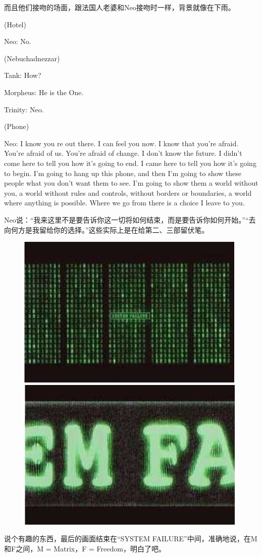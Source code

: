 \documentclass[UTF8]{ctexart}
\newenvironment{myquote}{\color{green} \setlength{\leftskip}{6em} \setlength{\rightskip}{4em} \setlength{\parindent}{-2em}}{\par}
\begin{document}
而且他们接吻的场面，跟法国人老婆和Neo接吻时一样，背景就像在下雨。

\begin{myquote}
(Hotel)

Neo: No.

(Nebuchadnezzar)

Tank: How?

Morpheus: He is the One.

Trinity: Neo.

(Phone)

Neo: I know you re out there. I can feel you now. I know that you're afraid. You're afraid of us. You're afraid of change. I don't know the future. I didn't come here to tell you how it's going to end. I came here to tell you how it's going to begin. I'm going to hang up this phone, and then I'm going to show these people what you don't want them to see. I'm going to show them a world without you, a world without rules and controls, without borders or boundaries, a world where anything is possible. Where we go from there is a choice I leave to you.
\end{myquote}

Neo说：“我来这里不是要告诉你这一切将如何结束，而是要告诉你如何开始。”“去向何方是我留给你的选择。”这些实际上是在给第二、三部留伏笔。

\newpage

\begin{figure}[htb]
\centering
\includegraphics[width=0.45\linewidth]{fig/read_Matrix-90}
\includegraphics[width=0.45\linewidth]{fig/read_Matrix-91}
\end{figure}

说个有趣的东西，最后的画面结束在“SYSTEM FAILURE”中间，准确地说，在M和F之间，M = Matrix，F = Freedom，明白了吧。
\end{document}
